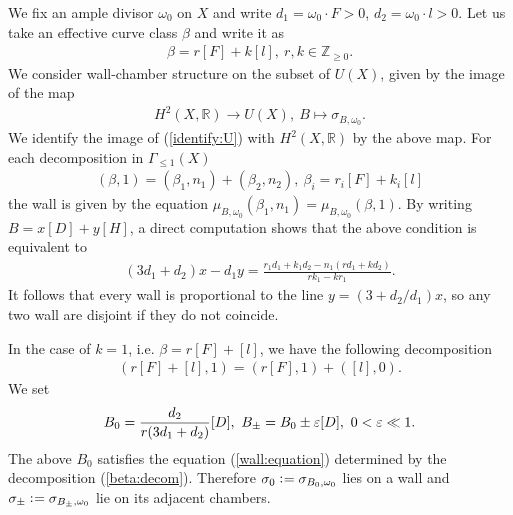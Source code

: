 \documentclass[11pt]{amsart}
\theoremstyle{plain}
\theoremstyle{definition}
\theoremstyle{remark}
\begin{document}
We fix an ample divisor $\omega_0$ on $X$
and write
$d_1=\omega_0 \cdot F>0$, 
$d_2=\omega_0 \cdot l>0$. 
Let us take an effective 
curve class $\beta$ and write it 
as 
\begin{align*}
\beta=r[F]+k[l], \ 
r, k \in \mathbb{Z}_{\ge 0}.
\end{align*}
We consider wall-chamber structure 
on the subset of $U(X)$, 
given by the image of the map
\begin{align}\label{identify:U}
H^2(X, \mathbb{R}) \to
U(X), \ 
B \mapsto \sigma_{B, \omega_0}.
\end{align}
We identify the image of (\ref{identify:U})
with $H^2(X, \mathbb{R})$
by the above map. 
For each decomposition in $\Gamma_{\le 1}(X)$
\begin{align}\label{decom:beta1}
(\beta, 1)=(\beta_1, n_1)+(\beta_2, n_2), \ 
\beta_i=r_i[F]+k_i[l]
\end{align}
the wall is given by the equation 
$\mu_{B, \omega_0}(\beta_1, n_1)=\mu_{B, \omega_0}(\beta, 1)$.
By writing $B=x[D]+y[H]$, 
a direct computation shows that 
the above condition is equivalent to
\begin{align}\label{wall:equation}
(3d_1+d_2)x-d_1y=
\frac{r_1d_1+k_1 d_2 -n_1(rd_1+kd_2)}{rk_1-kr_1}.
\end{align}
It follows that every wall is proportional 
to the line $y=(3+d_2/d_1)x$, so any two 
wall are
disjoint if they do not coincide. 

In the case of $k=1$, i.e. 
$\beta=r[F]+[l]$, 
we have the following 
decomposition 
\begin{align}\label{beta:decom}
(r[F]+[l], 1)=(r[F], 1)+([l], 0). 
\end{align} 
We set 
\begin{align}\notag
B_0=\frac{d_2}{r(3d_1+d_2)}[D], \ 
B_{\pm}=B_0 \pm \varepsilon[D], \ 
0<\varepsilon \ll 1.
\end{align}
The above $B_0$ 
satisfies the equation 
(\ref{wall:equation})
determined by the decomposition (\ref{beta:decom}).
Therefore $\sigma_0 \cneq \sigma_{B_0, \omega_0}$ lies 
on a wall  
and $\sigma_{\pm} \cneq \sigma_{B_{\pm}, \omega_0}$ lie on 
its adjacent chambers. 
\end{document}
